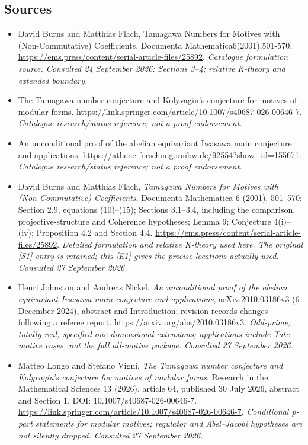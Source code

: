 \documentclass[11pt,a4paper]{article}
\numberwithin{equation}{section}
\begin{document}
\subsection{Sources}
\begin{itemize}\raggedright
\item[\textnormal{[S1]}]\hypertarget{source:58:1}{} David Burns and Matthias Flach, Tamagawa Numbers for Motives with (Non-Commutative) Coefficients, Documenta Mathematica6(2001),501-570.
\url{https://ems.press/content/serial-article-files/25892}.
{\small\textit{Catalogue formulation source. Consulted 24 September 2026: Sections 3--4; relative K-theory and extended boundary.}}
\item[\textnormal{[S2]}]\hypertarget{source:58:2}{} The Tamagawa number conjecture and Kolyvagin's conjecture for motives of modular forms.
\url{https://link.springer.com/article/10.1007/s40687-026-00646-7}.
{\small\textit{Catalogue research/status reference; not a proof endorsement.}}
\item[\textnormal{[S3]}]\hypertarget{source:58:3}{} An unconditional proof of the abelian equivariant Iwasawa main conjecture and applications.
\url{https://athene-forschung.unibw.de/92554?show_id=155671}.
{\small\textit{Catalogue research/status reference; not a proof endorsement.}}

\item[\textnormal{[E1]}]\hypertarget{extra:58:1}{} David Burns and Matthias Flach, \emph{Tamagawa Numbers for Motives with (Non-Commutative) Coefficients}, Documenta Mathematica 6 (2001), 501--570: Section 2.9, equations (10)--(15); Sections 3.1--3.4, including the comparison, projective-structure and Coherence hypotheses; Lemma 9; Conjecture 4(i)--(iv); Proposition 4.2 and Section 4.4.
\url{https://ems.press/content/serial-article-files/25892}.
{\small\textit{Detailed formulation and relative K-theory used here. The original [S1] entry is retained; this [E1] gives the precise locations actually used. Consulted 27 September 2026.}}
\item[\textnormal{[E2]}]\hypertarget{extra:58:2}{} Henri Johnston and Andreas Nickel, \emph{An unconditional proof of the abelian equivariant Iwasawa main conjecture and applications}, arXiv:2010.03186v3 (6 December 2024), abstract and Introduction; revision records changes following a referee report.
\url{https://arxiv.org/abs/2010.03186v3}.
{\small\textit{Odd-prime, totally real, specified one-dimensional extensions; applications include Tate-motive cases, not the full all-motive package. Consulted 27 September 2026.}}
\item[\textnormal{[E3]}]\hypertarget{extra:58:3}{} Matteo Longo and Stefano Vigni, \emph{The Tamagawa number conjecture and Kolyvagin's conjecture for motives of modular forms}, Research in the Mathematical Sciences 13 (2026), article 64, published 30 July 2026, abstract and Section 1. DOI: 10.1007/s40687-026-00646-7.
\url{https://link.springer.com/article/10.1007/s40687-026-00646-7}.
{\small\textit{Conditional p-part statements for modular motives; regulator and Abel--Jacobi hypotheses are not silently dropped. Consulted 27 September 2026.}}
\end{itemize}
\end{document}
